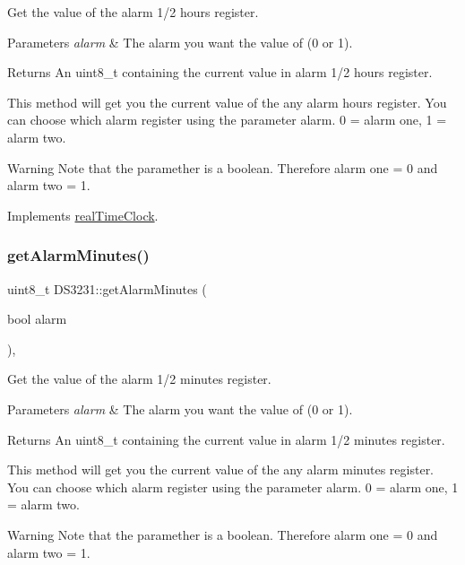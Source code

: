 Get the value of the alarm 1/2 hours register. 


\begin{DoxyParams}{Parameters}
{\em alarm} & The alarm you want the value of (0 or 1). \\
\hline
\end{DoxyParams}
\begin{DoxyReturn}{Returns}
An uint8\+\_\+t containing the current value in alarm 1/2 hours register.
\end{DoxyReturn}
This method will get you the current value of the any alarm hours register. You can choose which alarm register using the parameter alarm. 0 = alarm one, 1 = alarm two. \begin{DoxyWarning}{Warning}
Note that the paramether is a boolean. Therefore alarm one = 0 and alarm two = 1. 
\end{DoxyWarning}


Implements \mbox{\hyperlink{classreal_time_clock_abca1ab557b357e3046d7d97eec89f750}{real\+Time\+Clock}}.

\mbox{\label{class_d_s3231_ae11a0dcc34e9c8a9b875989172339957}} 
\subsubsection{\texorpdfstring{get\+Alarm\+Minutes()}{getAlarmMinutes()}}
{\footnotesize\ttfamily uint8\+\_\+t D\+S3231\+::get\+Alarm\+Minutes (\begin{DoxyParamCaption}\item[{bool}]{alarm }\end{DoxyParamCaption})\hspace{0.3cm}{\ttfamily [override]}, {\ttfamily [virtual]}}



Get the value of the alarm 1/2 minutes register. 


\begin{DoxyParams}{Parameters}
{\em alarm} & The alarm you want the value of (0 or 1). \\
\hline
\end{DoxyParams}
\begin{DoxyReturn}{Returns}
An uint8\+\_\+t containing the current value in alarm 1/2 minutes register.
\end{DoxyReturn}
This method will get you the current value of the any alarm minutes register. You can choose which alarm register using the parameter alarm. 0 = alarm one, 1 = alarm two. \begin{DoxyWarning}{Warning}
Note that the paramether is a boolean. Therefore alarm one = 0 and alarm two = 1. 
\end{DoxyWarning}


